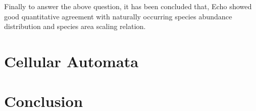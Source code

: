 Finally to answer the above question, it has been concluded that, Echo showed good quantitative agreement with naturally occurring species abundance distribution and species area scaling relation.

\section{Cellular Automata}

\section{Conclusion}